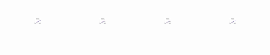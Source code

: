 \begin{figure}[ht]
\begin{tabular}{cccc}
	  \begin{subfigure}[b]{0.22\textwidth}
	  	\includegraphics[width=110pt]{images/speedup_friendster10M_setcover.eps}
			\caption{}
			\label{appfig:speedup_friendster10M_setcover}
	  \end{subfigure} &
	  \begin{subfigure}[b]{0.22\textwidth}
	  	\includegraphics[width=110pt]{images/speedup_arabic2005_setcover.eps}
			\caption{}
			\label{appfig:speedup_arabic2005_setcover}
	  \end{subfigure} &
	  \begin{subfigure}[b]{0.22\textwidth}
	  	\includegraphics[width=110pt]{images/speedup_uk2005_setcover.eps}
			\caption{}
			\label{appfig:speedup_uk2005_setcover}
	  \end{subfigure} &
	  \begin{subfigure}[b]{0.22\textwidth}
	  	\includegraphics[width=110pt]{images/speedup_it2004_setcover.eps}
			\caption{}
			\label{appfig:speedup_it2004_setcover}
	  \end{subfigure} \\
	  \begin{subfigure}[b]{0.22\textwidth}

\end{subfigure}
\end{tabular}
\end{figure}
